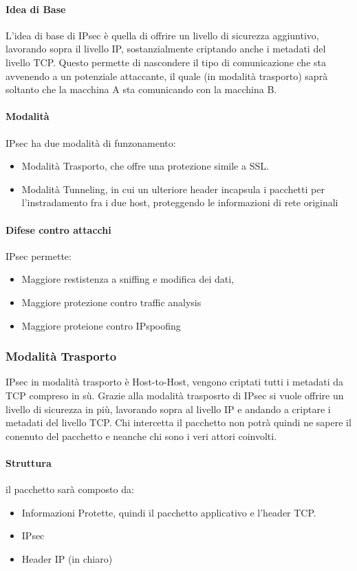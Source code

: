 \documentclass[12pt, a4paper, openany]{book}
\begin{document}
\paragraph*{Idea di Base}
L'idea di base di IPsec è quella di offrire un livello di sicurezza aggiuntivo, lavorando sopra il livello IP, sostanzialmente criptando anche i metadati del livello TCP.
Questo permette di nascondere il tipo di comunicazione che sta avvenendo a un potenziale attaccante, il quale (in modalità trasporto) saprà soltanto che la macchina A sta comunicando con la macchina B.

\paragraph*{Modalità}
IPsec ha due modalità di funzonamento:
\begin{itemize}
    \item Modalità Trasporto, che offre una protezione simile a SSL.
    \item Modalità Tunneling, in cui un ulteriore header incapsula i pacchetti per l'instradamento fra i due host, proteggendo le informazioni di rete originali 
\end{itemize}

\paragraph{Difese contro attacchi}
IPsec permette:
\begin{itemize}
    \item Maggiore restistenza a sniffing e modifica dei dati,
    \item Maggiore protezione contro traffic analysis
    \item Maggiore proteione contro IPspoofing
\end{itemize}
\subsubsection{Modalità Trasporto}
IPsec in modalità trasporto è Host-to-Host, vengono criptati tutti i metadati da TCP compreso in sù.
Grazie alla modalità trasposrto di IPsec si vuole offrire un livello di sicurezza in più, lavorando sopra al livello IP e andando a criptare i metadati del livello TCP.
Chi intercetta il pacchetto non potrà quindi ne sapere il conenuto del pacchetto e neanche chi sono i veri attori coinvolti.
\paragraph*{Struttura} il pacchetto sarà composto da:
\begin{itemize}
    \item Informazioni Protette, quindi il pacchetto applicativo e l'header TCP.
    \item IPsec
    \item Header IP (in chiaro)
\end{itemize}
\end{document}
